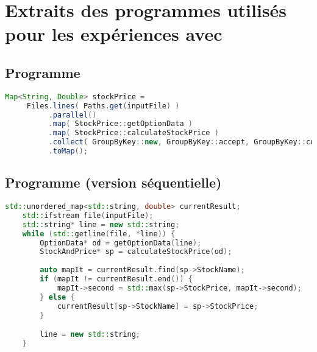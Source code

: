 \chapter{Extraits des programmes utilisés pour les expériences avec }
\label{appendice-code-stockprice.ann}

\section{Programme }

\begin{lstlisting}[gobble=3,basicstyle=\ttfamily\footnotesize,language=java]
   Map<String, Double> stockPrice =
     Files.lines( Paths.get(inputFile) )
          .parallel()
          .map( StockPrice::getOptionData )
          .map( StockPrice::calculateStockPrice )
          .collect( GroupByKey::new, GroupByKey::accept, GroupByKey::combine )
          .toMap();
\end{lstlisting}

\newpage
\section{Programme  (version séquentielle)}
\begin{lstlisting}[gobble=4,basicstyle=\ttfamily\footnotesize,language=c++]
    std::unordered_map<std::string, double> currentResult;
    std::ifstream file(inputFile);
    std::string* line = new std::string;
    while (std::getline(file, *line)) {
        OptionData* od = getOptionData(line);
        StockAndPrice* sp = calculateStockPrice(od);
        
        auto mapIt = currentResult.find(sp->StockName);
        if (mapIt != currentResult.end()) {
            mapIt->second = std::max(sp->StockPrice, mapIt->second);
        } else {
            currentResult[sp->StockName] = sp->StockPrice;
        }

        line = new std::string;
    }
\end{lstlisting}

\newpage
